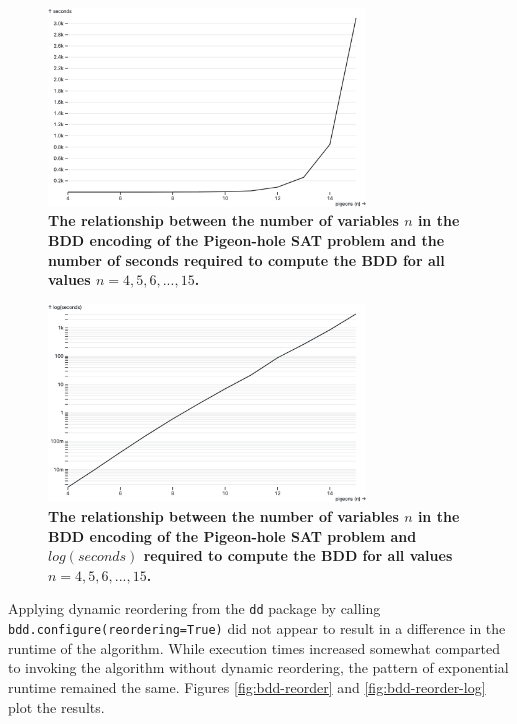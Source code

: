 \documentclass{article}
\newcommand{\code}[1]{\texttt{#1}}
\begin{document}
\begin{figure}[ht]
  \centering
  \includegraphics[width=0.75\textwidth]{bdd}
  \caption{\textbf{The relationship between the number of variables $n$ in the BDD encoding of the Pigeon-hole SAT problem and the number of seconds required to compute the BDD for all values $n = 4, 5, 6,...,15$.}}
  \label{fig:bdd-pigeon-hole}
\end{figure}

\begin{figure}[ht]
  \centering
  \includegraphics[width=0.75\textwidth]{bdd-log}
  \caption{\textbf{The relationship between the number of variables $n$ in the BDD encoding of the Pigeon-hole SAT problem and $log(seconds)$ required to compute the BDD for all values $n = 4, 5, 6,...,15$.}}
  \label{fig:bdd-pigeon-hole-log}
\end{figure}

\medskip
\noindent Applying dynamic reordering from the \code{dd} package by calling \code{bdd.configure(reordering=True)} did not appear to result in a difference in the runtime of the algorithm. While execution times increased somewhat comparted to invoking the algorithm without dynamic reordering, the pattern of exponential runtime remained the same. Figures \ref{fig:bdd-reorder} and \ref{fig:bdd-reorder-log} plot the results.
\end{document}
